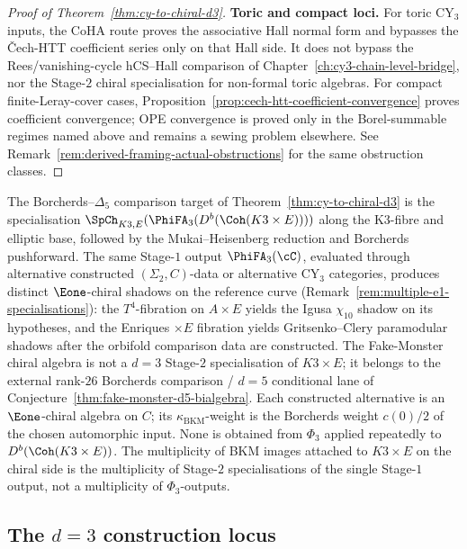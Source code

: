 \begin{proof}[Proof of Theorem~\textup{\ref{thm:cy-to-chiral-d3}}]
\smallskip\noindent\textbf{Toric and compact loci.}
For toric CY$_3$ inputs, the CoHA route proves the associative Hall
normal form and bypasses the \v{C}ech-HTT coefficient series only on that
Hall side. It does not bypass the Rees/vanishing-cycle hCS--Hall
comparison of Chapter~\ref{ch:cy3-chain-level-bridge}, nor the
Stage-$2$ chiral specialisation for non-formal toric algebras. For
compact finite-Leray-cover cases,
Proposition~\ref{prop:cech-htt-coefficient-convergence} proves
coefficient convergence; OPE convergence is proved only in the
Borel-summable regimes named above and remains a sewing problem
elsewhere. See Remark~\textup{\ref{rem:derived-framing-actual-obstructions}}
for the same obstruction classes.
\end{proof}

\begin{remark}
\label{rem:alternative-spch-cy3}
The Borcherds--$\Delta_5$ comparison target of Theorem~\textup{\ref{thm:cy-to-chiral-d3}} is the specialisation $\SpCh_{K3, E}(\PhiFA_3(D^b(\Coh(K3 \times E))))$ along the K3-fibre and elliptic base, followed by the Mukai--Heisenberg reduction and Borcherds pushforward. The same Stage-$1$ output $\PhiFA_3(\cC)$, evaluated through alternative constructed $(\Sigma_2, C)$-data or alternative CY$_3$ categories, produces distinct $\Eone$-chiral shadows on the reference curve (Remark~\textup{\ref{rem:multiple-e1-specialisations}}): the $T^4$-fibration on $A \times E$ yields the Igusa $\chi_{10}$ shadow on its hypotheses, and the Enriques $\times E$ fibration yields Gritsenko--Clery paramodular shadows after the orbifold comparison data are constructed. The Fake-Monster chiral algebra is not a $d = 3$ Stage-$2$ specialisation of $K3 \times E$; it belongs to the external rank-$26$ Borcherds comparison / $d = 5$ conditional lane of Conjecture~\textup{\ref{thm:fake-monster-d5-bialgebra}}. Each constructed alternative is an $\Eone$-chiral algebra on $C$; its $\kappa_{\mathrm{BKM}}$-weight is the Borcherds weight $c(0)/2$ of the chosen automorphic input. None is obtained from $\Phi_3$ applied repeatedly to $D^b(\Coh(K3 \times E))$. The multiplicity of BKM images attached to $K3 \times E$ on the chiral side is the multiplicity of Stage-$2$ specialisations of the single Stage-$1$ output, not a multiplicity of $\Phi_3$-outputs.
\end{remark}

\subsection{The \texorpdfstring{$d = 3$}{d = 3} construction locus}
\label{subsec:d3-scope}


